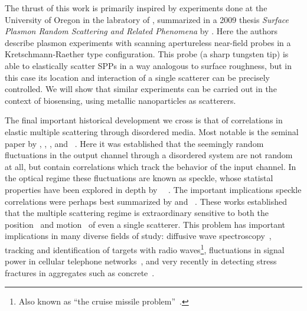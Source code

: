 The thrust of this work is primarily inspired by experiments done at the
University of Oregon in the labratory of , summarized
in a 2009 thesis \textit{Surface Plasmon Random Scattering and Related
Phenomena} \cite{schumann2009surface} by .  Here
the authors describe plasmon experiments with scanning apertureless
near-field probes in a Kretschmann-Raether type configuration.  This probe
(a sharp tungsten tip) is able to elastically scatter SPPs in a way
analogous to surface roughness, but in this case its location and
interaction of a single scatterer can be precisely controlled.  We will
show that similar experiments can be carried out in the context of
biosensing, using metallic nanoparticles as scatterers.

The final important historical development we cross is that of correlations
in elastic multiple scattering through disordered media.  Most notable is
the seminal paper by , , , and
~\cite{feng1988correlations}.  Here it was established that
the seemingly random fluctuations in the output channel through a
disordered system are not random at all, but contain correlations which
track the behavior of the input channel.  In the optical regime these
fluctuations are known as speckle, whose statistal properties have been
explored in depth by
~\cite{goodman2007speckle}~\cite{goodman1975statistical}.
The important implications speckle correlations were perhaps best
summarized by  and
~\cite{berkovits1994correlations}.  These works established that
the multiple scattering regime is extraordinary sensitive to both the
position~\cite{berkovits1990theory} and
motion~\cite{berkovits1991sensitivity} of even a single scatterer.  This
problem has important implications in many diverse fields of study:
diffusive wave spectroscopy~\cite{pine1988diffusing}, tracking and
identification of targets with radio waves\footnote{Also known as ``the cruise missile
problem''~\cite{atkins1991neural}.}, fluctuations in signal power in
cellular telephone networks~\cite{abdi2001estimation}, and
very recently in detecting stress fractures in aggregates such as
concrete~\cite{larose2010locating}.  

